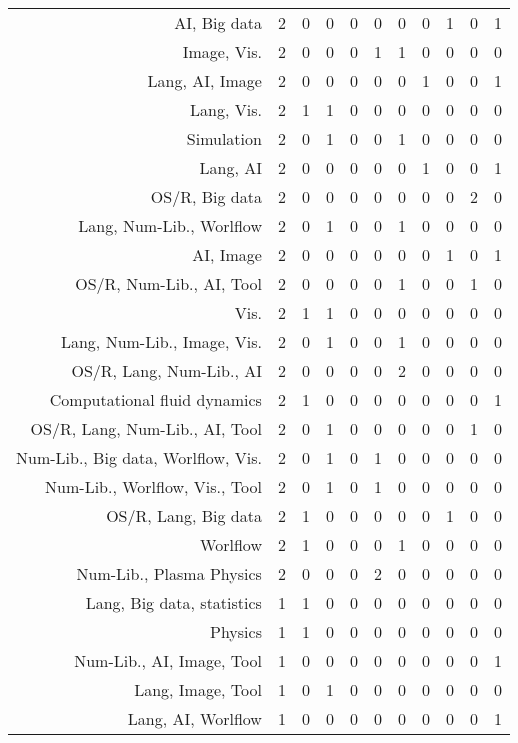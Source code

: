 {\begin{landscape}
\begin{longtable}[htb]{r|c|c|c|c|c|c|c|c|c|c}
{AI, Big data} & 2 & 0 & 0 & 0 & 0 & 0 & 0 & 1 & 0 & 1 \\%
{Image, Vis.} & 2 & 0 & 0 & 0 & 1 & 1 & 0 & 0 & 0 & 0 \\%
{Lang, AI, Image} & 2 & 0 & 0 & 0 & 0 & 0 & 1 & 0 & 0 & 1 \\%
{Lang, Vis.} & 2 & 1 & 1 & 0 & 0 & 0 & 0 & 0 & 0 & 0 \\%
{Simulation} & 2 & 0 & 1 & 0 & 0 & 1 & 0 & 0 & 0 & 0 \\%
{Lang, AI} & 2 & 0 & 0 & 0 & 0 & 0 & 1 & 0 & 0 & 1 \\%
{OS/R, Big data} & 2 & 0 & 0 & 0 & 0 & 0 & 0 & 0 & 2 & 0 \\%
{Lang, Num-Lib., Worlflow} & 2 & 0 & 1 & 0 & 0 & 1 & 0 & 0 & 0 & 0 \\%
{AI, Image} & 2 & 0 & 0 & 0 & 0 & 0 & 0 & 1 & 0 & 1 \\%
{OS/R, Num-Lib., AI, Tool} & 2 & 0 & 0 & 0 & 0 & 1 & 0 & 0 & 1 & 0 \\%
{Vis.} & 2 & 1 & 1 & 0 & 0 & 0 & 0 & 0 & 0 & 0 \\%
{Lang, Num-Lib., Image, Vis.} & 2 & 0 & 1 & 0 & 0 & 1 & 0 & 0 & 0 & 0 \\%
{OS/R, Lang, Num-Lib., AI} & 2 & 0 & 0 & 0 & 0 & 2 & 0 & 0 & 0 & 0 \\%
{Computational fluid dynamics} & 2 & 1 & 0 & 0 & 0 & 0 & 0 & 0 & 0 & 1 \\%
{OS/R, Lang, Num-Lib., AI, Tool} & 2 & 0 & 1 & 0 & 0 & 0 & 0 & 0 & 1 & 0 \\%
{Num-Lib., Big data, Worlflow, Vis.} & 2 & 0 & 1 & 0 & 1 & 0 & 0 & 0 & 0 & 0 \\%
{Num-Lib., Worlflow, Vis., Tool} & 2 & 0 & 1 & 0 & 1 & 0 & 0 & 0 & 0 & 0 \\%
{OS/R, Lang, Big data} & 2 & 1 & 0 & 0 & 0 & 0 & 0 & 1 & 0 & 0 \\%
{Worlflow} & 2 & 1 & 0 & 0 & 0 & 1 & 0 & 0 & 0 & 0 \\%
{Num-Lib., Plasma Physics} & 2 & 0 & 0 & 0 & 2 & 0 & 0 & 0 & 0 & 0 \\%
{Lang, Big data, statistics} & 1 & 1 & 0 & 0 & 0 & 0 & 0 & 0 & 0 & 0 \\%
{Physics} & 1 & 1 & 0 & 0 & 0 & 0 & 0 & 0 & 0 & 0 \\%
{Num-Lib., AI, Image, Tool} & 1 & 0 & 0 & 0 & 0 & 0 & 0 & 0 & 0 & 1 \\%
{Lang, Image, Tool} & 1 & 0 & 1 & 0 & 0 & 0 & 0 & 0 & 0 & 0 \\%
{Lang, AI, Worlflow} & 1 & 0 & 0 & 0 & 0 & 0 & 0 & 0 & 0 & 1 \\%

\end{longtable}
\end{landscape}}
